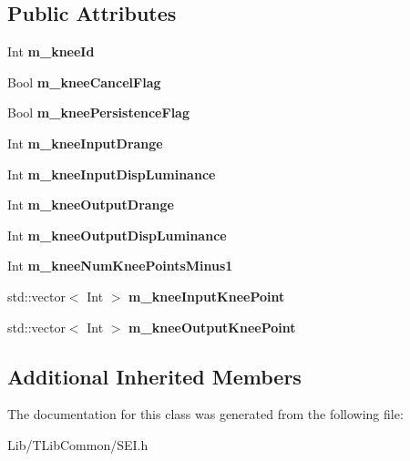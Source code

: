 \subsection*{Public Attributes}
\begin{DoxyCompactItemize}
\item 
\mbox{\label{class_s_e_i_knee_function_info_a0d10fe58f456faa7c567ae9289090035}} 
Int {\bfseries m\+\_\+knee\+Id}
\item 
\mbox{\label{class_s_e_i_knee_function_info_a8bfe60a14ae0475b7b305881aab12613}} 
Bool {\bfseries m\+\_\+knee\+Cancel\+Flag}
\item 
\mbox{\label{class_s_e_i_knee_function_info_aa1a1b81fe19b86386d7edf2f50b78efd}} 
Bool {\bfseries m\+\_\+knee\+Persistence\+Flag}
\item 
\mbox{\label{class_s_e_i_knee_function_info_ac1c514cb3bd7f11050e48faebc686e52}} 
Int {\bfseries m\+\_\+knee\+Input\+Drange}
\item 
\mbox{\label{class_s_e_i_knee_function_info_a3497e31fc83c50390213a9e8190b9d16}} 
Int {\bfseries m\+\_\+knee\+Input\+Disp\+Luminance}
\item 
\mbox{\label{class_s_e_i_knee_function_info_a6eba5fdf3035565d0c66527f4ab7d54e}} 
Int {\bfseries m\+\_\+knee\+Output\+Drange}
\item 
\mbox{\label{class_s_e_i_knee_function_info_ac128984f92a6a59e6756afc179cfdbb3}} 
Int {\bfseries m\+\_\+knee\+Output\+Disp\+Luminance}
\item 
\mbox{\label{class_s_e_i_knee_function_info_aa8e3166279f65f19fe598d4ae9737b86}} 
Int {\bfseries m\+\_\+knee\+Num\+Knee\+Points\+Minus1}
\item 
\mbox{\label{class_s_e_i_knee_function_info_a949a16d01117ed5e3e704d34d3e207e5}} 
std\+::vector$<$ Int $>$ {\bfseries m\+\_\+knee\+Input\+Knee\+Point}
\item 
\mbox{\label{class_s_e_i_knee_function_info_a9f9feba6b33a385805269f025907049a}} 
std\+::vector$<$ Int $>$ {\bfseries m\+\_\+knee\+Output\+Knee\+Point}
\end{DoxyCompactItemize}
\subsection*{Additional Inherited Members}


The documentation for this class was generated from the following file\+:\begin{DoxyCompactItemize}
\item 
Lib/\+T\+Lib\+Common/S\+E\+I.\+h\end{DoxyCompactItemize}
